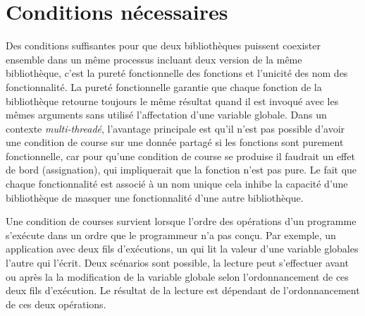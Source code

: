 \documentclass[12pt,initial,twoside,maitrise]{dms}
\numberwithin{equation}{section}
\numberwithin{table}{chapter}
\numberwithin{figure}{chapter}
\begin{document}



%
%


\section{Conditions nécessaires}%
Des conditions suffisantes pour que deux bibliothèques puissent coexister ensemble
dans un même processus incluant deux version de la même bibliothèque, c'est la pureté fonctionnelle des
fonctions et l'unicité des nom des fonctionnalité. La pureté fonctionnelle garantie
que chaque fonction de la bibliothèque retourne toujours le même résultat quand il
est invoqué avec les mêmes arguments sans utilisé l'affectation d'une variable globale.
Dans un contexte \textit{multi-threadé}, l'avantage principale est qu'il n'est pas possible
d'avoir une condition de course sur une donnée partagé si les fonctions sont purement fonctionnelle,
car pour qu'une condition de course se produise il faudrait un effet de bord (assignation), qui impliquerait
que la fonction n'est pas pure. Le fait que chaque fonctionnalité est associé à un nom unique cela inhibe
la capacité d'une bibliothèque de masquer une fonctionnalité d'une autre bibliothèque.

Une condition de courses
survient lorsque l'ordre des opérations d'un programme s'exécute dans un ordre
que le programmeur n'a pas conçu. Par exemple, un application avec deux fils
d'exécutions, un qui lit la valeur d'une variable globales l'autre qui l'écrit.
Deux scénarios sont possible, la lecture peut s'effectuer avant ou après la la
modification de la variable globale selon l'ordonnancement de ces deux fils d'exécution.
Le résultat de la lecture est dépendant de l'ordonnancement de ces deux opérations.
\end{document}
